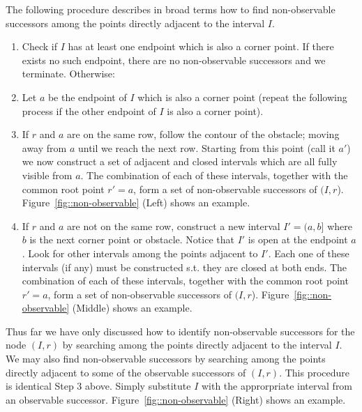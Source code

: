 The following procedure describes in broad terms how to find non-observable successors 
among the points directly adjacent to the interval $I$.
\begin{enumerate}
\item Check if $I$ has at least one endpoint which is also a corner point. If
there exists no such endpoint, there are no non-observable successors and we
terminate. Otherwise:
\item Let $a$ be the endpoint of $I$ which is also a corner point (repeat the
following process if the other endpoint of $I$ is also a corner point).
\item If $r$ and $a$ are on the same row, follow the contour of the obstacle;
moving away from $a$ until we reach the next row. Starting from this point
(call it $a'$) we now construct a set of adjacent and closed intervals which
are all fully visible from $a$.  The combination of each of these intervals,
together with the common root point $r' = a$, form a set of non-observable
successors of $(I,r$). Figure~\ref{fig::non-observable} (Left) shows an
example.
\item If $r$ and $a$ are not on the same row, construct a new interval $I' =
(a, b]$ where $b$ is the next corner point or obstacle. Notice that $I'$ is
open at the endpoint $a$.  Look for other intervals among the points adjacent
to $I'$. Each one of these intervals (if any) must be constructed s.t. they
are closed at both ends.  The combination of each of these intervals,
together with the common root point $r' = a$, form a set of non-observable
successors of $(I,r$). Figure~\ref{fig::non-observable} (Middle) shows an
example.
\end{enumerate}

Thus far we have only discussed how to identify non-observable successors for
the node $(I, r)$ by searching among the points directly adjacent to the
interval $I$. We may also find non-observable successors by searching among
the points directly adjacent to some of the observable successors of $(I, r)$.
This procedure is identical Step 3 above. Simply substitute $I$ with the
approrpriate interval from an observable successor.
Figure~\ref{fig::non-observable} (Right) shows an example.

